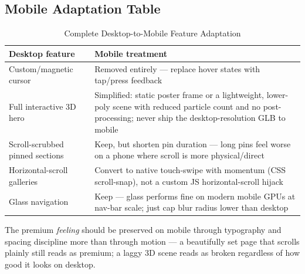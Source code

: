 \documentclass[conference]{IEEEtran}
\begin{document}
\subsection{Mobile Adaptation Table}
\begin{table}[t]
\centering
\caption{Complete Desktop-to-Mobile Feature Adaptation}
\label{tab:mobile_full}
\begin{tabular}{L{4.0cm}L{12.5cm}}
\toprule
\textbf{Desktop feature} & \textbf{Mobile treatment} \\
\midrule
Custom/magnetic cursor & Removed entirely --- replace hover states with tap/press feedback \\
Full interactive 3D hero & Simplified: static poster frame or a lightweight, lower-poly scene with reduced particle count and no post-processing; never ship the desktop-resolution GLB to mobile \\
Scroll-scrubbed pinned sections & Keep, but shorten pin duration --- long pins feel worse on a phone where scroll is more physical/direct \\
Horizontal-scroll galleries & Convert to native touch-swipe with momentum (CSS scroll-snap), not a custom JS horizontal-scroll hijack \\
Glass navigation & Keep --- glass performs fine on modern mobile GPUs at nav-bar scale; just cap blur radius lower than desktop \\
\bottomrule
\end{tabular}
\end{table}

The premium \emph{feeling} should be preserved on mobile through typography and spacing discipline more than through motion --- a beautifully set page that scrolls plainly still reads as premium; a laggy 3D scene reads as broken regardless of how good it looks on desktop.
\end{document}
